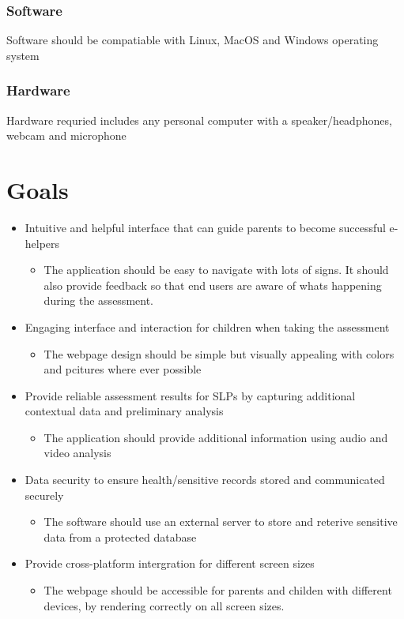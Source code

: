 \documentclass{article}
\begin{document}
\subsubsection{Software}
Software should be compatiable with Linux, MacOS and Windows operating system
\subsubsection{Hardware}
Hardware requried includes any personal computer with a speaker/headphones, webcam and microphone\\

\section{Goals}
\begin{itemize}
    \item Intuitive and helpful interface that can guide parents to become successful e-helpers
    \begin{itemize}
        \item The application should be easy to navigate with lots of signs. It should also provide feedback so that end users are aware of whats happening during the assessment.
    \end{itemize}
    
    \item Engaging interface and interaction for children when taking the assessment
    \begin{itemize}
        \item The webpage design should be simple but visually appealing with colors and pcitures where ever possible 
    \end{itemize}
    
    \item Provide reliable assessment results for SLPs by capturing additional contextual data and preliminary analysis
    \begin{itemize}
        \item The application should provide additional information using audio and video analysis
    \end{itemize}
    \item Data security to ensure health/sensitive records stored and communicated securely
    \begin{itemize}
        \item The software should use an external server to store and reterive sensitive data from a protected database
    \end{itemize}
    \item Provide cross-platform intergration for different screen sizes 
    \begin{itemize}
        \item The webpage should be accessible for parents and childen with different devices, by rendering correctly on all screen sizes. 
    \end{itemize}
\end{itemize}
\end{document}
